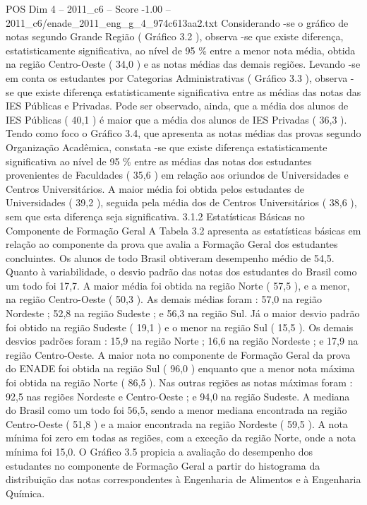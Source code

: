 \begin{textsample}{POS Dim 4 – 2011\_c6 – Score -1.00 – 2011\_c6/enade\_2011\_eng\_g\_4\_974c613aa2.txt}
Considerando -se o gráfico de notas segundo Grande Região ( Gráfico 3.2 ), observa -se que existe diferença, estatisticamente significativa, ao nível de 95 \% entre a menor nota média, obtida na região Centro-Oeste ( 34,0 ) e as notas médias das demais regiões.
Levando -se em conta os estudantes por Categorias Administrativas ( Gráfico 3.3 ), observa -se que existe diferença estatisticamente significativa entre as médias das notas das IES Públicas e Privadas.
Pode ser observado, ainda, que a média dos alunos de IES Públicas ( 40,1 ) é maior que a média dos alunos de IES Privadas ( 36,3 ).
Tendo como foco o Gráfico 3.4, que apresenta as notas médias das provas segundo Organização Acadêmica, constata -se que existe diferença estatisticamente significativa ao nível de 95 \% entre as médias das notas dos estudantes provenientes de Faculdades ( 35,6 ) em relação aos oriundos de Universidades e Centros Universitários.
A maior média foi obtida pelos estudantes de Universidades ( 39,2 ), seguida pela média dos de Centros Universitários ( 38,6 ), sem que esta diferença seja significativa. 3.1.2 Estatísticas Básicas no Componente de Formação Geral A Tabela 3.2 apresenta as estatísticas básicas em relação ao componente da prova que avalia a Formação Geral dos estudantes concluintes.
Os alunos de todo Brasil obtiveram desempenho médio de 54,5.
Quanto à variabilidade, o desvio padrão das notas dos estudantes do Brasil como um todo foi 17,7.
A maior média foi obtida na região Norte ( 57,5 ), e a menor, na região Centro-Oeste ( 50,3 ).
As demais médias foram : 57,0 na região Nordeste ; 52,8 na região Sudeste ; e 56,3 na região Sul.
Já o maior desvio padrão foi obtido na região Sudeste ( 19,1 ) e o menor na região Sul ( 15,5 ).
Os demais desvios padrões foram : 15,9 na região Norte ; 16,6 na região Nordeste ; e 17,9 na região Centro-Oeste.
A maior nota no componente de Formação Geral da prova do ENADE foi obtida na região Sul ( 96,0 ) enquanto que a menor nota máxima foi obtida na região Norte ( 86,5 ).
Nas outras regiões as notas máximas foram : 92,5 nas regiões Nordeste e Centro-Oeste ; e 94,0 na região Sudeste.
A mediana do Brasil como um todo foi 56,5, sendo a menor mediana encontrada na região Centro-Oeste ( 51,8 ) e a maior encontrada na região Nordeste ( 59,5 ).
A nota mínima foi zero em todas as regiões, com a exceção da região Norte, onde a nota mínima foi 15,0.
O Gráfico 3.5 propicia a avaliação do desempenho dos estudantes no componente de Formação Geral a partir do histograma da distribuição das notas correspondentes à Engenharia de Alimentos e à Engenharia Química.

\end{textsample}
